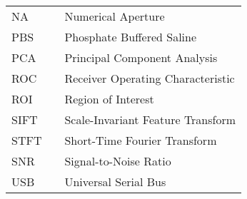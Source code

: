 \begin{center}
\begin{tabular}{lll}
    NA   & \dotfill & Numerical Aperture \\
    PBS  & \dotfill & Phosphate Buffered Saline \\
    PCA  & \dotfill & Principal Component Analysis \\
    ROC  & \dotfill & Receiver Operating Characteristic \\
    ROI  & \dotfill & Region of Interest \\
    SIFT & \dotfill & Scale-Invariant Feature Transform \\
    STFT & \dotfill & Short-Time Fourier Transform \\
    SNR  & \dotfill & Signal-to-Noise Ratio \\
    USB  & \dotfill & Universal Serial Bus \\
  \end{tabular}
\end{center}
\cleardoublepage


\newpage
\endofprelim
